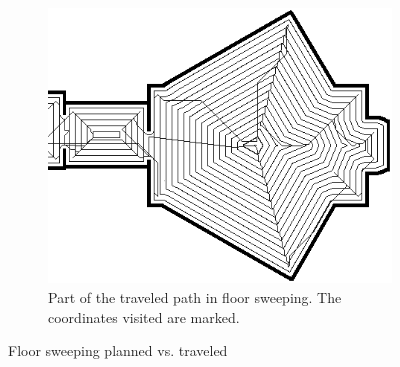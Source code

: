 \begin{figure}[ht]
\begin{subfigure}[t]{0.3\textwidth}
    \includegraphics[width = \textwidth]{graphics/floor_sweep_robot}
    \caption{Part of the traveled path in floor sweeping. The coordinates visited are marked.}
    \label{floor_sweep_robot}
  \end{subfigure}
\caption{Floor sweeping planned vs. traveled}
\label{floor_sweeping_results}
\end{figure}
